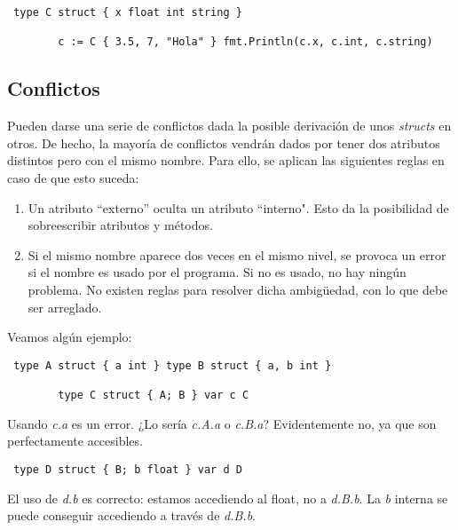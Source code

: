 	\begin{verbatim} type C struct { x float int string }
	    
		c := C { 3.5, 7, "Hola" } fmt.Println(c.x, c.int, c.string)
		\end{verbatim}
	
	\subsection{Conflictos}
	
	Pueden darse una serie de conflictos dada la posible derivación de unos
	\textit{structs} en otros. De hecho, la mayoría de conflictos vendrán dados
	por tener dos atributos distintos pero con el mismo nombre. Para ello, se
	aplican las siguientes reglas en caso de que esto suceda:
	
	\begin{enumerate} \item Un atributo ``externo'' oculta un atributo
	``interno". Esto da la posibilidad de sobreescribir atributos y métodos.
	\item Si el mismo nombre aparece dos veces en el mismo nivel, se provoca un
	error si el nombre es usado por el programa. Si no es usado, no hay ningún
	problema. No existen reglas para resolver dicha ambigüedad, con lo que debe
	ser arreglado.  \end{enumerate}
	
	Veamos algún ejemplo:
	
	\begin{verbatim} type A struct { a int } type B struct { a, b int }
	    
		type C struct { A; B } var c C \end{verbatim}
	
	Usando \textit{c.a} es un error. ¿Lo sería \textit{c.A.a} o \textit{c.B.a}?
	Evidentemente no, ya que son perfectamente accesibles.
	
	\begin{verbatim} type D struct { B; b float } var d D \end{verbatim}
	
	El uso de \textit{d.b} es correcto: estamos accediendo al float, no
	a \textit{d.B.b}. La \textit{b} interna se puede conseguir accediendo
	a través de \textit{d.B.b}.
